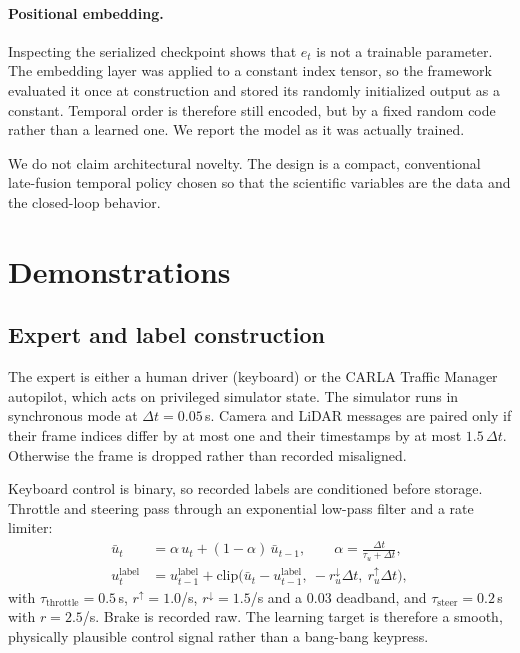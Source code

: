\documentclass[11pt]{article}
\begin{document}
\paragraph{Positional embedding.} Inspecting the serialized checkpoint shows that $e_t$ is not a trainable parameter. The embedding layer was applied to a constant index tensor, so the framework evaluated it once at construction and stored its randomly initialized output as a constant. Temporal order is therefore still encoded, but by a fixed random code rather than a learned one. We report the model as it was actually trained.

We do not claim architectural novelty. The design is a compact, conventional late-fusion temporal policy chosen so that the scientific variables are the data and the closed-loop behavior.

\section{Demonstrations}
\label{sec:demos}

\subsection{Expert and label construction}

The expert is either a human driver (keyboard) or the CARLA Traffic Manager autopilot, which acts on privileged simulator state. The simulator runs in synchronous mode at $\Delta t = 0.05$\,s. Camera and LiDAR messages are paired only if their frame indices differ by at most one and their timestamps by at most $1.5\,\Delta t$. Otherwise the frame is dropped rather than recorded misaligned.

Keyboard control is binary, so recorded labels are conditioned before storage. Throttle and steering pass through an exponential low-pass filter and a rate limiter:
\begin{align}
\bar u_t &= \alpha\, u_t + (1-\alpha)\,\bar u_{t-1}, \qquad \alpha = \frac{\Delta t}{\tau_u + \Delta t}, \\
u^{\text{label}}_t &= u^{\text{label}}_{t-1} + \mathrm{clip}\big(\bar u_t - u^{\text{label}}_{t-1},\ -r^{\downarrow}_u\Delta t,\ r^{\uparrow}_u \Delta t\big),
\end{align}
with $\tau_{\text{throttle}} = 0.5$\,s, $r^{\uparrow} = 1.0$/s, $r^{\downarrow} = 1.5$/s and a 0.03 deadband, and $\tau_{\text{steer}} = 0.2$\,s with $r = 2.5$/s. Brake is recorded raw. The learning target is therefore a smooth, physically plausible control signal rather than a bang-bang keypress.
\end{document}
